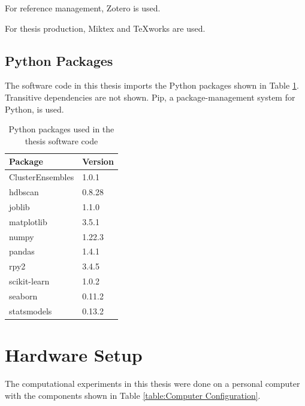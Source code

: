 \begin{theappendices}
For reference management, Zotero is used.

For thesis production, Miktex and TeXworks are used.

\subsection{Python Packages}

The software code in this thesis imports the Python packages shown in Table \ref{table:Python Packages}. Transitive dependencies are not shown. Pip, a package-management system for Python, is used.

\begin{table}
\centering
\begin{tabular}{ll}
\toprule
         Package & Version \\
\midrule
ClusterEnsembles &   1.0.1 \\
         hdbscan &  0.8.28 \\
          joblib &   1.1.0 \\
      matplotlib &   3.5.1 \\
           numpy &  1.22.3 \\
          pandas &   1.4.1 \\
            rpy2 &   3.4.5 \\
    scikit-learn &   1.0.2 \\
         seaborn &  0.11.2 \\
     statsmodels &  0.13.2 \\
\bottomrule
\end{tabular}
\caption{Python packages used in the thesis software code}
\label{table:Python Packages}
\end{table}

\section{Hardware Setup}

The computational experiments in this thesis were done on a personal computer with the components shown in Table \ref{table:Computer Configuration}.


\end{theappendices}
